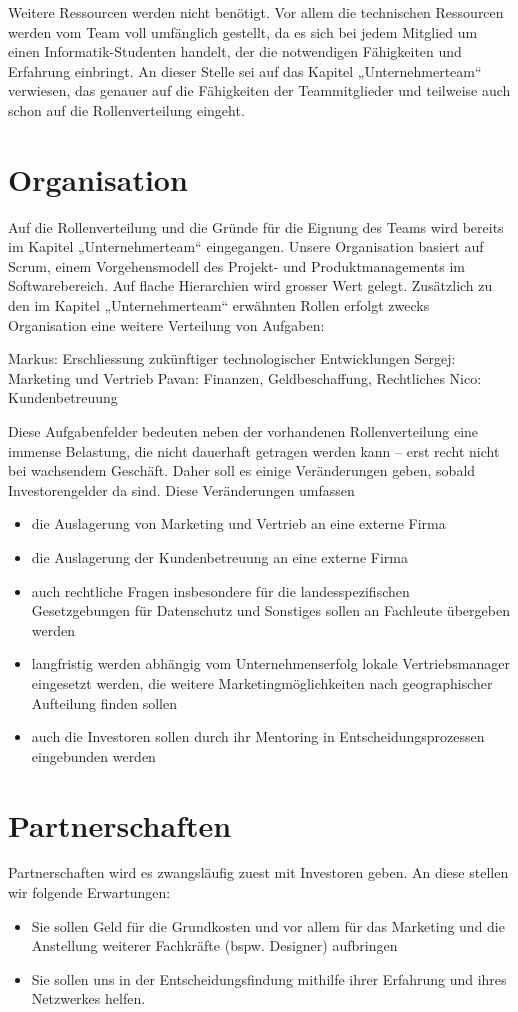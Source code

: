 Weitere Ressourcen werden nicht benötigt. Vor allem die technischen Ressourcen werden vom Team voll umfänglich gestellt, da es sich bei jedem Mitglied um einen Informatik-Studenten handelt, der die notwendigen Fähigkeiten und Erfahrung einbringt. An dieser Stelle sei auf das Kapitel „Unternehmerteam“ verwiesen, das genauer auf die Fähigkeiten der Teammitglieder und teilweise auch schon auf die Rollenverteilung eingeht.


\section{Organisation}
Auf die Rollenverteilung und die Gründe für die Eignung des Teams wird bereits im Kapitel „Unternehmerteam“ eingegangen. Unsere Organisation basiert auf Scrum, einem Vorgehensmodell des Projekt- und Produktmanagements im Softwarebereich. Auf flache Hierarchien wird grosser Wert gelegt. Zusätzlich zu den im Kapitel „Unternehmerteam“ erwähnten Rollen erfolgt zwecks Organisation eine weitere Verteilung von Aufgaben:

Markus: Erschliessung zukünftiger technologischer Entwicklungen
Sergej: Marketing und Vertrieb
Pavan: Finanzen, Geldbeschaffung, Rechtliches
Nico: Kundenbetreuung

Diese Aufgabenfelder bedeuten neben der vorhandenen Rollenverteilung eine immense Belastung, die nicht dauerhaft getragen werden kann – erst recht nicht bei wachsendem Geschäft. Daher soll es einige Veränderungen geben, sobald Investorengelder da sind. Diese Veränderungen umfassen

\begin{itemize}
\item die Auslagerung von Marketing und Vertrieb an eine externe Firma
\item die Auslagerung der Kundenbetreuung an eine externe Firma
\item auch rechtliche Fragen insbesondere für die landesspezifischen Gesetzgebungen für Datenschutz und Sonstiges sollen an Fachleute übergeben werden
\item langfristig werden abhängig vom Unternehmenserfolg lokale Vertriebsmanager eingesetzt werden, die weitere Marketingmöglichkeiten nach geographischer Aufteilung finden sollen
\item auch die Investoren sollen durch ihr Mentoring in Entscheidungsprozessen eingebunden werden
\end{itemize}


\section{Partnerschaften}
Partnerschaften wird es zwangsläufig zuest mit Investoren geben. An diese stellen wir folgende Erwartungen:
\begin{itemize}
\item Sie sollen Geld für die Grundkosten und vor allem für das Marketing und die Anstellung weiterer Fachkräfte (bspw. Designer) aufbringen
\item Sie sollen uns in der Entscheidungsfindung mithilfe ihrer Erfahrung und ihres Netzwerkes helfen.
\end{itemize}

